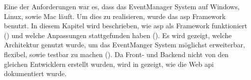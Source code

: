 
Eine der Anforderungen war es, dass das EventManager System auf Windows, Linux, sowie Mac läuft. Um dies zu realisieren, wurde das \gls{asp} Framework benutzt. In diesem Kapitel wird beschrieben, wie \gls{asp} als Framework funktioniert () und welche Anpassungen stattgefunden haben (). Es wird gezeigt, welche Architektur genutzt wurde, um das EventManger System möglichst erweiterbar, flexibel, sowie testbar zu machen (). Da Front- und Backend nicht von den gleichen Entwicklern erstellt wurden, wird in  gezeigt, wie die Web \gls{api} dokumentiert wurde.
